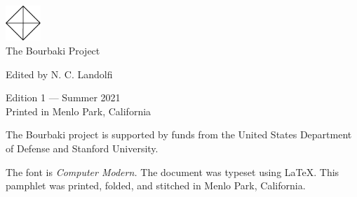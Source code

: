 




\usepackage{tocloft}
\setlength{\cftsecnumwidth}{3em}



\begin{center}
  \includegraphics[width=0.1\textwidth]{../trademark}
  \\
  \vspace{0.5cm}
  \textsf{\Large The Bourbaki Project}

{\small \textsf{Edited by N. C. Landolfi}}
\end{center}

\vspace{\fill}

\begin{center}
  {\small \textsf{Edition 1 --- Summer 2021}} \\

  {\footnotesize \textsf{Printed in Menlo Park, California}}
\end{center}

\thispagestyle{empty}

% 
% 
\clearpage

\tableofcontents

\clearpage



\clearpage


The Bourbaki project is supported by funds from the United States Department of Defense and Stanford University.

\clearpage

\noindent\noindent The font is \textit{Computer Modern.}
The document was typeset using \LaTeX.
This pamphlet was printed, folded, and stitched in Menlo Park, California.


